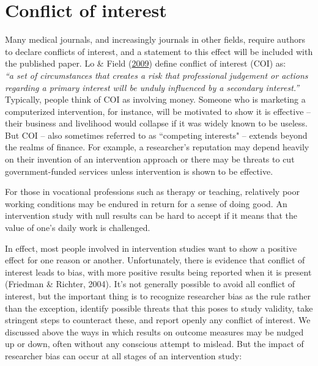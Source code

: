 \documentclass{krantz}
\begin{document}
\hypertarget{conflict-of-interest}{%
\section{Conflict of interest}\label{conflict-of-interest}}

Many medical journals, and increasingly journals in other fields, require authors to declare conflicts of interest, and a statement to this effect will be included with the published paper. Lo \& Field (\protect\hyperlink{ref-lo2009}{2009}) define conflict of interest (COI) as:\\
\emph{``a set of circumstances that creates a risk that professional judgement or actions regarding a primary interest will be unduly influenced by a secondary interest.''}\\
Typically, people think of COI as involving money. Someone who is marketing a computerized intervention, for instance, will be motivated to show it is effective -- their business and livelihood would collapse if it was widely known to be useless. But COI -- also sometimes referred to as ``competing interests" -- extends beyond the realms of finance. For example,  a researcher's reputation may depend heavily on their invention of an intervention approach or there may be threats to cut government-funded services unless intervention is shown to be effective.

For those in vocational professions such as therapy or teaching, relatively poor working conditions may be endured in return for a sense of doing good. An intervention study with null results can be hard to accept if it means that the value of one's daily work is challenged.

In effect, most people involved in intervention studies want to show a positive effect for one reason or another. Unfortunately, there is evidence that conflict of interest leads to bias, with more positive results being reported when it is present (Friedman \& Richter, 2004). It's not generally possible to avoid all conflict of interest, but the important thing is to recognize researcher bias as the rule rather than the exception, identify possible threats that this poses to study validity, take stringent steps to counteract these, and report openly any conflict of interest. We discussed above the ways in which results on outcome measures may be nudged up or down, often without any conscious attempt to mislead. But the impact of researcher bias can occur at all stages of an intervention study:
\end{document}
